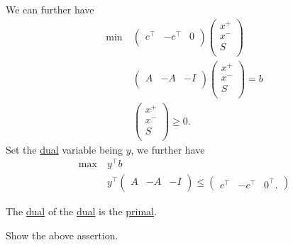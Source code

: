\begin{explanation}
	We can further have
	\begin{align*}
		\min~ & \begin{pmatrix}
			        c^{\top} & -c^{\top} & 0 \\
		        \end{pmatrix}\begin{pmatrix}
			                     x^+ \\
			                     x^- \\
			                     S   \\
		                     \end{pmatrix}    \\
		      & \begin{pmatrix}
			        A & -A & -I \\
		        \end{pmatrix}\begin{pmatrix}
			                     x^+ \\
			                     x^- \\
			                     S   \\
		                     \end{pmatrix} = b \\
		      & \begin{pmatrix}
			        x^+ \\
			        x^- \\
			        S   \\
		        \end{pmatrix}\geq 0.
	\end{align*}
	Set the \hyperref[def:dual]{dual} variable being \(y\), we further have
	\begin{align*}
		\max~ & y^{\top}b                                                    \\
		      & y^{\top} \begin{pmatrix}
			                 A & -A & -I \\
		                 \end{pmatrix} \leq \begin{pmatrix}
			                                    c^{\top} & -c^{\top} & 0^{\top}.
		                                    \end{pmatrix}
	\end{align*}
\end{explanation}

\begin{note}
	The \hyperref[def:dual]{dual} of the \hyperref[def:dual]{dual} is the \hyperref[def:primal]{primal}.
\end{note}
\begin{exercise}
	Show the above assertion.
\end{exercise}